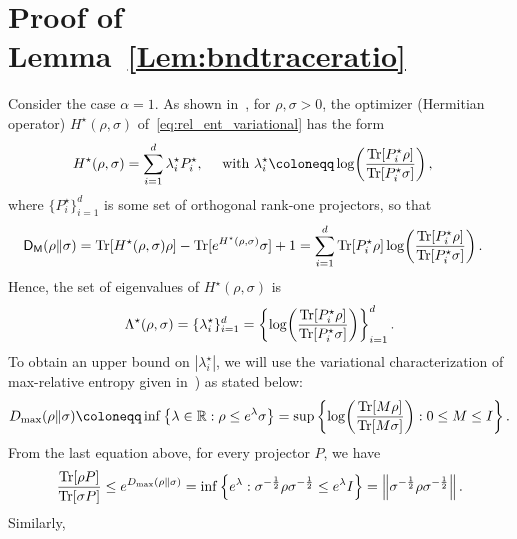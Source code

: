 \documentclass[a4paper,onecolumn,11pt,accepted=2026-05-12]{quantumarticle}
\newcommand{\norm}[1]{\left\Vert#1\right\Vert}
\newcommand{\abs}[1]{\left\vert#1\right\vert}
\newcommand{\sD}{\mathsf{D}}
\newcommand{\RR}{\mathbb{R}}
\begin{document}
\section{Proof of Lemma~\ref{Lem:bndtraceratio}} \label{Sec:Lem:bndtraceratio-proof}
Consider the case $\alpha=1$. 
As shown in~\cite{Berta2015OnEntropies}, for $\rho,\sigma>0$, the optimizer (Hermitian operator) $H^{\star}(\rho,\sigma)$ of~\eqref{eq:rel_ent_variational} has the form 
    \begin{align}
&H^{\star}(\rho,\sigma)= \sum_{i=1}^d \lambda_i^{\star} P_i^{\star}, \quad \mbox{ with } \lambda_i^{\star} \coloneqq\log  \!\left(\frac{\operatorname{Tr}[P_i^{\star} \rho]}{\operatorname{Tr}[P_i^{\star} \sigma]}\right), \notag 
\end{align}
 where  $\{P_i^{\star}\}_{i=1}^d $ is some set of  orthogonal rank-one projectors, so that
\begin{align}
  & \sD_{\mathsf{M}}(\rho\Vert\sigma)= \operatorname{Tr}[H^{\star}(\rho,\sigma)\rho
]-\operatorname{Tr}[e^{H^{\star}(\rho,\sigma)}\sigma]+1 
= \sum_{i=1}^d \operatorname{Tr}[P_i^{\star} \rho] \log  \!\left(\frac{\operatorname{Tr}[P_i^{\star} \rho]}{\operatorname{Tr}[P_i^{\star} \sigma]}\right).\notag
\end{align}
Hence, the set of eigenvalues of $H^{\star}(\rho,\sigma)$ is
\begin{align}
\Lambda^{\star}(\rho,\sigma)=\{\lambda_i^{\star}\}_{i=1}^d= \left\{\log  \!\left(\frac{\operatorname{Tr}[P_i^{\star} \rho]}{\operatorname{Tr}[P_i^{\star} \sigma]}\right)\right\}_{i=1}^d. \notag 
\end{align}
To obtain an upper bound on $\abs{\lambda_i^{\star}}$,   we will use the variational characterization of max-relative entropy given in~\cite[Lemma A.4]{Mosonyi2015QuantumHT}) as stated below:
\begin{align}
    D_{\max}(\rho\|\sigma)\coloneqq \inf \left\{\lambda \in \RR: \rho \leq e^{\lambda}\sigma \right\}= \sup \left\{ \log\! \left(\frac{\operatorname{Tr}[M\rho]}{\operatorname{Tr}[M\sigma]}\right): 0 \leq M \leq I\right\}. \notag
\end{align}
From the last equation above, for  every projector $P$, we have
\begin{align}
 \frac{\operatorname{Tr}[\rho P]}{\operatorname{Tr}[\sigma P]} \leq   e^{D_{\max}(\rho\|\sigma)}=\inf \left\{e^{\lambda} : \sigma^{-\frac 12}\rho \sigma^{-\frac 12} \leq e^{\lambda}  I \right\} = \norm{\sigma^{-\frac 12}\rho \sigma^{-\frac 12}}. \notag
\end{align}
Similarly, 
\end{document}
